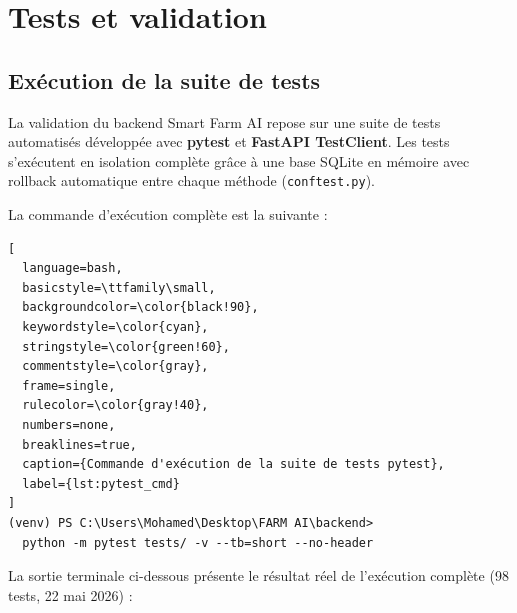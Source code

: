 %

\section{Tests et validation}

\subsection{Exécution de la suite de tests}

La validation du backend Smart Farm AI repose sur une suite de tests
automatisés développée avec \textbf{pytest} et \textbf{FastAPI TestClient}.
Les tests s'exécutent en isolation complète grâce à une base SQLite
en mémoire avec rollback automatique entre chaque méthode (\texttt{conftest.py}).

La commande d'exécution complète est la suivante :

\begin{lstlisting}[
  language=bash,
  basicstyle=\ttfamily\small,
  backgroundcolor=\color{black!90},
  keywordstyle=\color{cyan},
  stringstyle=\color{green!60},
  commentstyle=\color{gray},
  frame=single,
  rulecolor=\color{gray!40},
  numbers=none,
  breaklines=true,
  caption={Commande d'exécution de la suite de tests pytest},
  label={lst:pytest_cmd}
]
(venv) PS C:\Users\Mohamed\Desktop\FARM AI\backend>
  python -m pytest tests/ -v --tb=short --no-header
\end{lstlisting}

La sortie terminale ci-dessous présente le résultat réel de l'exécution
complète (98 tests, 22 mai 2026) :

